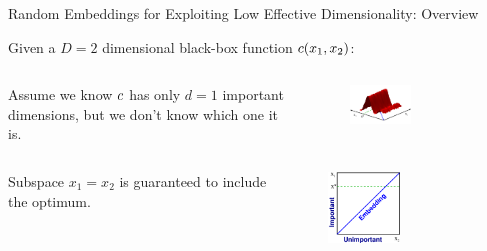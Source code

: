 \begin{frame}[c]{Random Embeddings for Exploiting Low Effective Dimensionality: Overview}

Given a $D=2$ dimensional black-box function $c(x_{1},x_{2})$:
\begin{itemize}
\begin{columns}[T]
\begin{column}{0.45\linewidth}


    \item Assume we know $c$ has only $d=1$ important dimensions, but we don't know which one it is.
    \end{column}
    \begin{column}{0.5\linewidth}
        \begin{figure}
    \includegraphics[width=0.5\textwidth]{images/highdim_images/Random_embeddings_in_a_nutshell1.png}
    \end{figure}
    \end{column}
\end{columns}
    \pause
    \begin{columns}[T]
    \begin{column}{0.45\linewidth}
    \vspace{-1em}
    \item Subspace $x_1=x_2$ is guaranteed to include the optimum.
        \end{column}
        \begin{column}{0.5\linewidth}
    \begin{figure}
    \includegraphics[width=0.5\textwidth]{images/highdim_images/Random_embeddings_in_a_nutshell2.png}

\end{figure}
\end{column}
\end{columns}
\end{itemize}
\end{frame}

